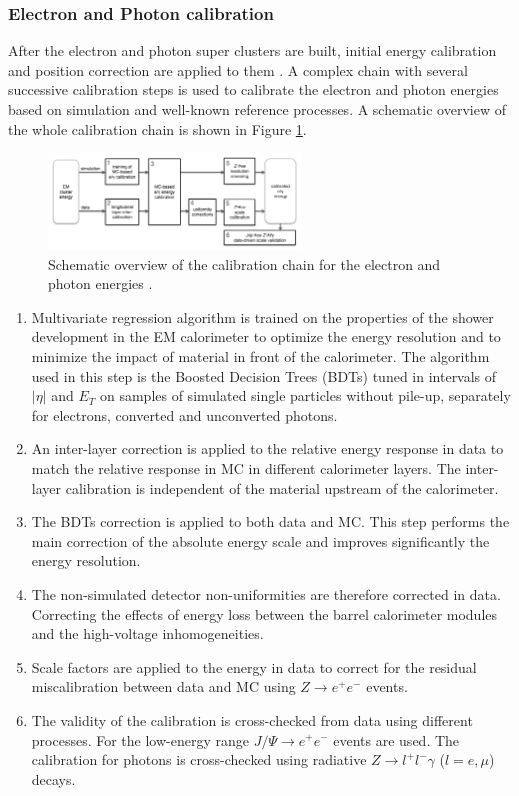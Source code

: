 \subsubsection{Electron and Photon calibration}
\label{chap2:Objects:Egamma:Cal}
After the electron and photon super clusters are built, initial energy calibration and position correction are applied to them \cite{Egamma_Calibration}. A complex chain with several successive calibration steps is used to calibrate the electron and photon energies based on simulation and well-known reference processes. A schematic overview of the whole calibration chain is shown in Figure \ref{fig:chap2:Objects:Egamma:Cal}.
\begin{figure}[htbp]
    \centering
    \includegraphics[width=0.6\textwidth]{Ch2/Img/Calibration_Chain.png}
    \caption{Schematic overview of the calibration chain for the electron and photon energies \cite{Egamma_Calib_run1}.}
    \label{fig:chap2:Objects:Egamma:Cal}
\end{figure}
\begin{enumerate}
    \item Multivariate regression algorithm is trained on the properties of the shower development in the EM calorimeter to optimize the energy resolution and to minimize the impact of material in front of the calorimeter. The algorithm used in this step is the Boosted Decision Trees (BDTs) tuned in intervals of $|\eta|$ and $E_T$ on samples of simulated single particles without pile-up, separately for electrons, converted and unconverted photons. 
    \item An inter-layer correction is applied to the relative energy response in data to match the relative response in MC in different calorimeter layers. The inter-layer calibration is independent of the material upstream of the calorimeter.
    \item The BDTs correction is applied to both data and MC. This step performs the main correction of the absolute energy scale and improves significantly the energy resolution.
    \item The non-simulated detector non-uniformities are therefore corrected in data. Correcting the effects of energy loss between the barrel calorimeter modules and the high-voltage inhomogeneities.
    \item Scale factors are applied to the energy in data to correct for the residual miscalibration between data and MC using $Z\rightarrow e^+e^-$ events.
    \item The validity of the calibration is cross-checked from data using different processes. For the low-energy range $J/\Psi\rightarrow e^+e^-$ events are used. The calibration for photons is cross-checked using radiative $Z\rightarrow l^+l^-\gamma$ ($l=e,\mu$) decays.
\end{enumerate}

